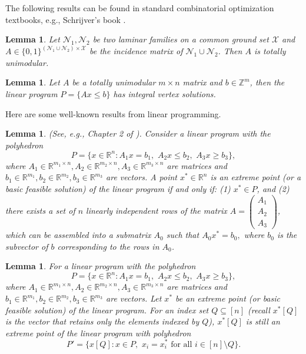 \documentclass[11pt,a4paper]{article} \usepackage{enumitem}
\newcommand{\assigned}[1]{[ #1 ]}
\newcommand{\calX}{\mathcal{X}}
\newcommand{\calN}{\mathcal{N}}
\newcommand{\Z}{\mathbb{Z}}
\newtheorem{lemma}[theorem]{Lemma}
\theoremstyle{definition}
\begin{document}
The following results can be found in standard combinatorial optimization textbooks, e.g., Schrijver's book \cite{schrijver2003combinatorial}.

\begin{lemma}
\label{theorem:laminar:intersection}
Let $\calN_1,\calN_2$ be two laminar families on a common ground set $\calX$ and $A\in\{0,1\}^{(\calN_1\cup\calN_2)\times\calX}$ be the incidence matrix of $\calN_1\cup\calN_2$.
Then $A$ is totally unimodular.
\end{lemma}

\begin{lemma}
\label{theorem:TUM}
Let $A$ be a totally unimodular $m\times n$ matrix and $b\in\Z^m$, then the linear program $P=\{Ax\leq b\}$ has integral vertex solutions.
\end{lemma}

Here are some well-known results from linear programming.

\begin{lemma}
\label{lem:extreme:points}
(See, e.g., Chapter 2 of \cite{10.5555/548834}). Consider a linear program with the polyhedron 
$$
P = \{x \in \mathbb{R} ^n : A_1x = b_1, \,\,A_2x \leq b_2, \,\, A_3x \geq b_3\},
$$ 
where $A_1 \in \mathbb{R}^{m_1 \times n}, A_2 \in \mathbb{R}^{m_2 \times n}, A_3 \in \mathbb{R}^{m_3 \times n}$ are matrices and $b_1 \in \mathbb{R}^{m_1}, b_2 \in \mathbb{R}^{m_2}, b_3 \in \mathbb{R}^{m_3}$ are vectors. 
A point $x^* \in \mathbb{R}^n$ is an extreme point (or a basic feasible solution) of the linear program if and only if:
(1) $x^* \in P$, and
(2) there exists a set of $n$ linearly independent rows of the matrix $A = \begin{pmatrix} A_1 \\ A_2 \\ A_3 \end{pmatrix}$, which can be assembled into a submatrix $A_0$ such that
$A_0 x^* = b_0,$ 
where $b_0$ is the subvector of $b$ corresponding to the rows in $A_0$.
\end{lemma}

\begin{lemma}
\label{lem:LinearProg-2}
For a linear program with the polyhedron 
$$
P = \{x \in \mathbb{R}^n : 
A_1x = b_1, \,\, A_2x \leq b_2, \,\, A_3x \geq b_3\},
$$
where $A_1 \in \mathbb{R}^{m_1 \times n}, A_2 \in \mathbb{R}^{m_2 \times n}, A_3 \in \mathbb{R}^{m_3 \times n}$ are matrices and $b_1 \in \mathbb{R}^{m_1}, b_2 \in \mathbb{R}^{m_2}, b_3 \in \mathbb{R}^{m_3}$ are vectors. Let $x^*$ be an extreme point (or basic feasible solution) of the linear program. For an index set $Q \subseteq [n]$ (recall $x^*\assigned{Q}$ is the vector that retains only the elements indexed by $Q$), $x^*\assigned{Q}$ is still an extreme point of the linear program with polyhedron 
$$
P' = \{ x\assigned{Q} : x \in P, \,\,
x_i = x^*_i \text{ for all } i \in [n] \setminus Q \}.
$$ 
\end{lemma}
\end{document}
